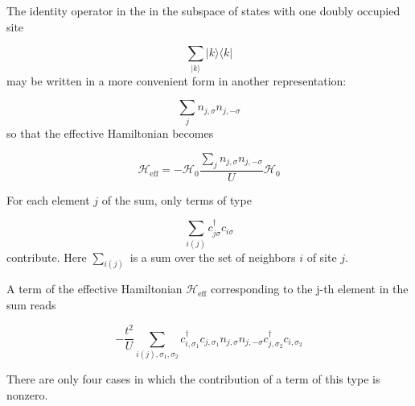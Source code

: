 The identity operator in the in the subspace of states with one doubly occupied site

\begin{equation*}
\sum_{ | k \rangle} | k \rangle \langle k |
\end{equation*}
may be written in a more convenient form in another representation:

\begin{equation*}
\sum_j n_{j,\sigma} n_{j, -\sigma}
\end{equation*}
so that the effective Hamiltonian becomes

\begin{equation}
\mathcal{H}_{\text{eff}} = - \mathcal{H}_0 \frac{\sum_j n_{j,\sigma} n_{j, -\sigma}}{U} \mathcal{H}_0
\end{equation}

For each element $j$ of the sum, only terms of type 

\begin{equation*}
\sum_{i(j)} c_{j\sigma}^\dagger c_{i\sigma} 
\end{equation*}
contribute. Here $\sum_{i(j)}$ is a sum over the set of neighbors $i$ of site $j$.

A term of the effective Hamiltonian $\mathcal{H}_{\text{eff}}$ corresponding to the j-th element in the sum reads

\begin{equation*}
-\frac{t^2}{U} \sum_{i(j), \sigma_1, \sigma_2 } c_{i,\sigma_1}^\dagger c_{j,\sigma_1} n_{j,\sigma} n_{j, -\sigma} c_{j, \sigma_2}^\dagger c_{i, \sigma_2}
\end{equation*}

There are only four cases in which the contribution of a term of this type is nonzero.


